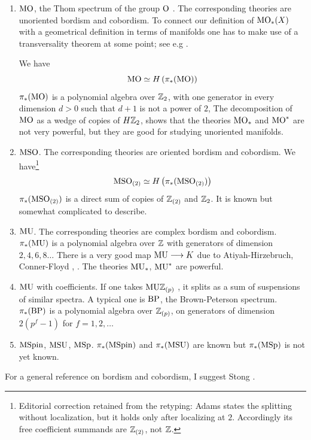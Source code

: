 \documentclass[../main]{subfiles}
\begin{document}
\begin{enumerate}[label = (\roman*)]
    \[K\vra{1-T}K\]
    You can read its homotopy groups off from the exact sequence of this fibering: we have 
    \[\ialign{$\hfil#$&\quad$#$&&\quad$#$\hfil\cr
    n&\equiv&0&1&2&3&4&\pmod 4\cr
    \pi_n(\te{KSC})&=&\bZ&\bZ_2&0&\bZ&\bZ.\cr}\]
    \item $\mathrm{MO}$, the Thom spectrum of the group $\mathrm{O}$ . The corresponding theories are unoriented bordism and cobordism. To connect our definition of $\mathrm{MO}_\ast(X)$ with a geometrical definition in terms of manifolds one  has to make use of a transversality theorem at some point; see e.g \cite{connerfloyd}.
    
    We have
    \[\mathrm{MO}\simeq H \left( \pi_\ast(\mathrm{MO}) \right)\]
    $\pi_\ast(\mathrm{MO})$ is a polynomial algebra over $\mathbb{Z}_2$, with one generator in every dimension $d>0$ such that $d+1$ is not a power of $2$, The decomposition of $\mathrm{MO}$ as a wedge of copies of $H\mathbb{Z}_2$, shows that the theories $\mathrm{MO}_\ast$ and $\mathrm{MO}^\ast$ are not very powerful, but they are good for studying unoriented manifolds.
    \item $\mathrm{MSO}$. The corresponding theories are oriented bordism and cobordism. We have\footnote{Editorial correction retained from the retyping: Adams states the splitting without localization, but it holds only after localizing at $2$. Accordingly its free coefficient summands are $\mathbb{Z}_{(2)}$, not $\mathbb{Z}$.}
    \[\mathrm{MSO}_{(2)}\simeq H \left( \pi_\ast(\mathrm{MSO}_{(2)}) \right)\]
    $\pi_\ast(\mathrm{MSO}_{(2)})$ is a direct sum of copies of $\mathbb{Z}_{(2)}$ and $\mathbb{Z}_2$. It is known but somewhat complicated to describe.
    \item $\mathrm{MU}$. The corresponding theories are complex bordism and cobordism. $\pi_\ast(\mathrm{MU})$ is a polynomial algebra over $\mathbb{Z}$ with generators of dimension $2,4,6,8\dots$ There is a very good map $\mathrm{MU}\longrightarrow K$  due to Atiyah-Hirzebruch, Conner-Floyd \cite{atiyahhirzebruch}, \cite{connerfloyd}. The theories $\mathrm{MU}_\ast$, $\mathrm{MU}^\ast$ are powerful.
    \item $\mathrm{MU}$ with coefficients. If one takes $\mathrm{MU}\mathbb{Z}_{(p)}$ , it splits as a sum of suspensions of similar spectra. A typical one is $\mathrm{BP}$, the Brown-Peterson spectrum. $\pi_\ast(\mathrm{BP})$ is a polynomial algebra over $\mathbb{Z}_{(p)}$, on generators of dimension $2(p^f-1)$ for $f=1, 2, \dots$
    \item $\mathrm{MSpin}$, $\mathrm{MSU}$, $\mathrm{MSp}$. $\pi_\ast(\mathrm{MSpin})$ and $\pi_\ast(\mathrm{MSU})$ are known but $\pi_\ast(\mathrm{MSp})$ is not yet known. %
    \end{enumerate}
    For a general reference on bordism and cobordism, I suggest Stong \cite{stong2}.
    
\end{document}
